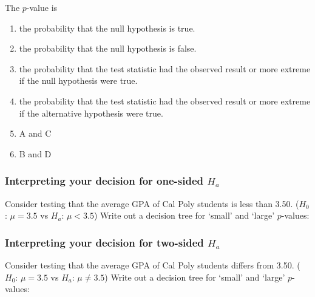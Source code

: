 \begin{frame}
\begin{clicker}
{The $p$-value is}
\begin{enumerate}
    \item
    the probability that the null hypothesis is true.
    \item
    the probability that the null hypothesis is false.
    \item
    the probability that the test statistic had the observed result or more extreme if the null hypothesis were true.
    \item
    the probability that the test statistic had the observed result or more extreme if the alternative hypothesis were true.
    \item
    A and C
    \item
    B and D
\end{enumerate}
\end{clicker}
\end{frame}


\begin{frame}
\frametitle{Interpreting your decision for one-sided $H_a$}
Consider testing that the average GPA of Cal Poly students is less than 3.50. ($H_0$: $\mu=3.5$ vs $H_a$: $\mu < 3.5$)
\vskip10pt
Write out a decision tree for `small' and `large' $p$-values:
\vskip200pt
\end{frame}

\begin{frame}
\frametitle{Interpreting your decision for two-sided $H_a$}
Consider testing that the average GPA of Cal Poly students differs from 3.50.  ($H_0$: $\mu=3.5$ vs $H_a$: $\mu \neq 3.5$)
\vskip10pt
Write out a decision tree for `small' and `large' $p$-values:
\vskip200pt
\end{frame}

